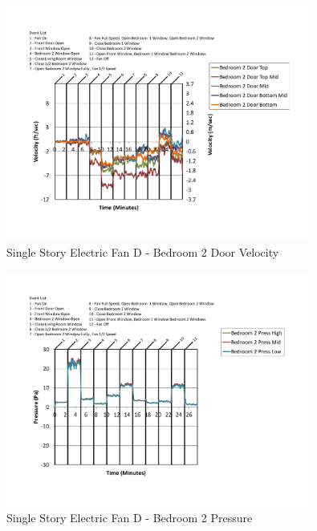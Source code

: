 \documentclass{article}
\begin{document}
\begin{appendices}
	\begin{figure}[H]
		\centering
		\includegraphics[height=3.05in,trim=0.67in 1.1in 0.67in 0.8in,clip=true]{0_Images/Results_Charts/ColdFlow/Single_Story/Electric/D/Bedroom_2_Door_Velocity.pdf}
		\caption{Single Story Electric Fan D - Bedroom 2 Door Velocity}
	\end{figure}
 

	\begin{figure}[H]
		\centering
		\includegraphics[height=3.05in,trim=0.67in 1.1in 0.67in 0.8in,clip=true]{0_Images/Results_Charts/ColdFlow/Single_Story/Electric/D/Bedroom_2_Pressure.pdf}
		\caption{Single Story Electric Fan D - Bedroom 2 Pressure}
	\end{figure}
 
	\clearpage


\end{appendices}
\end{document}
